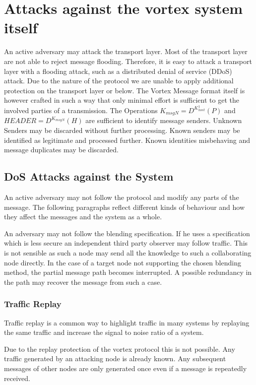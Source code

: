 \section{Attacks against the vortex system itself}
An active adversary may attack the transport layer. Most of the transport layer are not able to reject message flooding. Therefore, it is easy to attack a transport layer with a flooding attack, such as a distributed denial of service (DDoS) attack. Due to the nature of the protocol we are unable to apply additional protection on the transport layer or below. The Vortex Message format itself is however crafted in such a way that only minimal effort is sufficient to get the involved parties of a transmission. The Operations $ K_{msgN}=D^{K^{1}_{host}}\left(P\right)$ and $HEADER=D^{K_{msgN}}\left(H\right)$ are sufficient to identify message senders. Unknown Senders may be discarded without further processing. Known senders may be identified as legitimate and processed further. Known identities misbehaving and message duplicates may be discarded. 


\subsection{DoS Attacks against the System}
An active adversary may not follow the protocol and modify any parts of the message. The following paragraphs reflect different kinds of behaviour and how they affect the messages and the system as a whole.

An adversary may not follow the blending specification. If he uses a specification which is less secure an independent third party observer may follow traffic. This is not sensible as such a node may send all the knowledge to such a collaborating node directly. In the case of a  target node not supporting the chosen blending method, the partial message path becomes interrupted. A possible redundancy in the path may recover the message from such a case.

\subsubsection{Traffic Replay}
Traffic replay is a common way to highlight traffic in many systems by replaying the same traffic and increase the signal to noise ratio of a system. 

Due to the replay protection of the vortex protocol this is not possible. Any traffic generated by an attacking node is already known. Any subsequent messages of other nodes are only generated once even if a message is repeatedly received.

